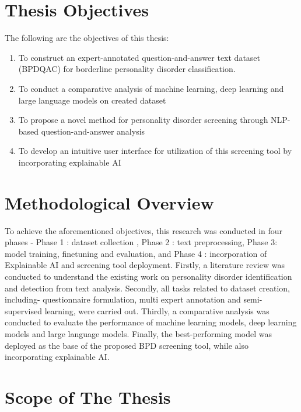 \section{Thesis Objectives}

The following are the objectives of this thesis: 
\begin{enumerate}
    \item To construct an expert-annotated question-and-answer text dataset (BPDQAC) for borderline personality disorder classification.

    \item To conduct a comparative analysis of machine learning, deep learning and large language models on created dataset

    \item To propose a novel method for personality disorder screening through NLP-based question-and-answer analysis

    \item To develop an intuitive user interface for utilization of this screening tool by incorporating explainable AI 
\end{enumerate}


\section{Methodological Overview}

To achieve the aforementioned objectives, this research was conducted in four phases - Phase 1 : dataset collection , Phase 2 : text preprocessing, Phase 3: model training,  finetuning and evaluation, and Phase 4 : incorporation of Explainable AI and screening tool deployment. Firstly, a literature review was conducted to understand the existing work on personality disorder identification and detection from text analysis. Secondly, all tasks related to dataset creation, including- questionnaire formulation, multi expert annotation and semi-supervised learning, were carried out. Thirdly, a comparative analysis was conducted to evaluate the performance of machine learning models, deep learning models and large language models. Finally, the best-performing model was deployed as the base of the proposed BPD screening tool, while also incorporating explainable AI. \


\section{Scope of The Thesis}

